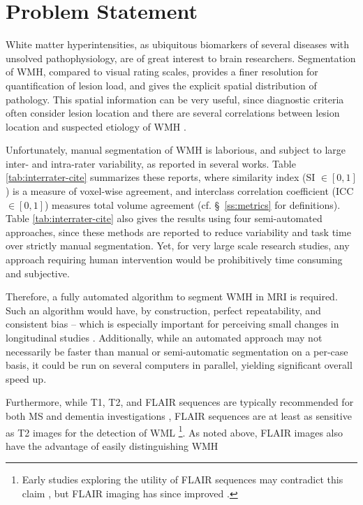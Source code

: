 \section{Problem Statement}
White matter hyperintensities,
as ubiquitous biomarkers of several diseases with unsolved pathophysiology,
are of great interest to brain researchers.
Segmentation of WMH, compared to visual rating scales, provides a finer resolution
for quantification of lesion load, and gives the explicit spatial distribution of pathology.
This spatial information can be very useful,
since diagnostic criteria often consider lesion location \cite{Sorbi2012}
and there are several correlations between lesion location
and suspected etiology of WMH \cite{Kim2008,Wardlaw2015}.
\par
Unfortunately, manual segmentation of WMH is
laborious, and subject to large inter- and intra-rater variability, as reported in several works.
Table \ref{tab:interrater-cite} summarizes these reports,
where similarity index (SI $\in [0,1]$) is a measure of voxel-wise agreement,
and interclass correlation coefficient (ICC $\in [0,1]$) measures total volume agreement
(cf. \S\ \ref{ss:metrics} for definitions).
Table \ref{tab:interrater-cite} also gives the results using four semi-automated approaches,
since these methods are reported to reduce variability and task time
over strictly manual segmentation.
Yet, for very large scale research studies,
any approach requiring human intervention would be prohibitively time consuming and subjective.
\par 
Therefore, a fully automated algorithm to segment WMH in MRI is required.
Such an algorithm would have, by construction,
perfect repeatability, and consistent bias -- which is especially important
for perceiving small changes in longitudinal studies \cite{MSISBI2015}.
Additionally, while an automated approach may not necessarily
be faster than manual or semi-automatic segmentation on a per-case basis,
it could be run on several computers in parallel, yielding significant overall speed up.
\par
Furthermore, while T1, T2, and FLAIR sequences are typically recommended
for both MS and dementia investigations \cite{Simon2006,Wardlaw2013,Traboulsee2015},
FLAIR sequences are at least as sensitive as T2 images for the detection of WML%
\footnote{Early studies exploring the utility of FLAIR sequences may contradict this claim 
  \cite{Okuda1999,Rovaris2000}, but FLAIR imaging has since improved \cite{Wardlaw2015}.}.
As noted above, FLAIR images also have the advantage of easily distinguishing WMH
